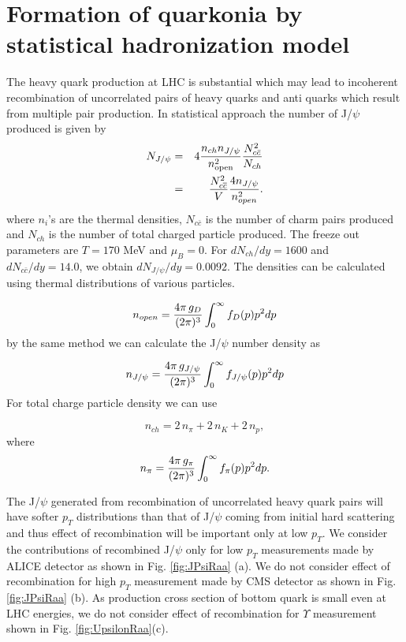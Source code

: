 \documentclass[aps,prc,preprint,superscriptaddress,showpacs,showkeys]{revtex4-1}
\begin{document}
\section{Formation of quarkonia  by statistical hadronization model}\label{SHM}
The heavy quark production at LHC is substantial which may lead to incoherent 
recombination of uncorrelated pairs of heavy quarks and anti quarks which result 
from multiple pair production. In statistical approach \cite{MUNZI} the number of 
J/$\psi$ produced is given by 
\begin{eqnarray}
N_{J/\psi}  &= &4 {n_{ch} n_{J/\psi} \over n_{\rm open}^2}  {N_{c\bar c}^2 \over N_{ch} }\\
          &= &\frac{N_{c\overline{c}}^{2}}{V}\frac{4n_{J/\psi}}{n_{open}^{2}}.
\end{eqnarray}
where $n_i$'s are the thermal densities, $N_{c\bar c}$ is the number of charm pairs produced 
and $N_{ch}$ is the number of total charged particle produced. 
The freeze out parameters are $T=170$ MeV and $\mu_B = 0$. For
$dN_{ch}/dy = 1600$ \cite{MULT} and $dN_{c \bar c} /dy = 14.0$, we obtain $dN_{J/\psi} /dy = 0.0092$.
The densities can be calculated using thermal distributions of various particles.

\begin{equation}
n_{open} = {4\pi \,g_{D} \over (2\pi)^{3}} \int_{0}^{\infty} f_{D}(p)p^{2}dp
\end{equation}
by the same method we can calculate the J/$\psi$ number density as

\begin{equation}
n_{J/\psi} = {4\pi \,g_{J/\psi} \over (2\pi)^{3}} \int_{0}^{\infty} f_{J/\psi}(p)p^{2}dp 
\end{equation}
 For total charge particle density we can use 

\begin{equation}
n_{ch} = 2 \,n_{\pi} + 2\, n_{K} + 2\, n_{p},
\end{equation}
where
\begin{equation}
n_{\pi} = {4\pi \,g_{\pi} \over (2\pi)^{3}} \int_{0}^{\infty} f_{\pi}(p)p^{2}dp.
\end{equation}

 The J/$\psi$ generated from recombination of uncorrelated heavy quark pairs will have 
softer $p_{T}$ distributions than that of J/$\psi$ coming from initial hard scattering and thus 
effect of recombination will be important only at low $p_T$. We consider the contributions of recombined J/$\psi$
only for low $p_{T}$ measurements made by ALICE detector as shown in Fig. \ref{fig:JPsiRaa} (a).     
 We do not consider effect of recombination for high $p_{T}$ measurement made by CMS detector \cite{CMSUpsilon,CMSJPsi} 
as shown in Fig. \ref{fig:JPsiRaa} (b). As production cross section of bottom quark is small even at LHC energies,
we do not consider effect of recombination for $\Upsilon$ measurement shown in Fig. \ref{fig:UpsilonRaa}(c).
\end{document}
